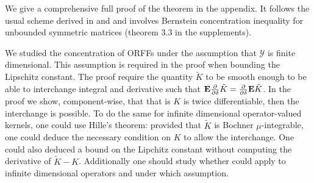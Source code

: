 We give a comprehensive full proof of the theorem in the appendix. It follows the usual scheme derived in \citet{Rahimi2007} and \citet{sutherland2015} and involves Bernstein concentration inequality for unbounded symmetric matrices (theorem 3.3 in the supplements). 
\begin{remark}\label{remark:infinite_dimension}
We studied the concentration of ORFFs under the assumption that $\mathcal{Y}$ is finite dimensional. This assumption is required in the proof when bounding the Lipschitz constant. The proof require the quantity $\tilde{K}$ to be smooth enough to be able to interchange integral and derivative such that ${\text{\textbf{E}}}\frac{\partial}{\partial \delta}\tilde{K}=\frac{\partial}{\partial \delta}{\text{\textbf{E}}}\tilde{K}$. In the proof we show, component-wise, that that is $K$ is twice differentiable, then the interchange is possible. To do the same for infinite dimensional operator-valued kernels, one could use Hille's theorem: provided that $\tilde{K}$ is Bochner $\mu$-integrable, one could deduce the necessary condition on $K$ to allow the interchange. One could also deduced a bound on the Lipchitz constant without computing the derivative of $\tilde{K}-K$. Additionally one should study whether \citet[theorem 4]{koltchinskii2013remark} could apply to infinite dimensional operators and under which assumption. 
\end{remark}
